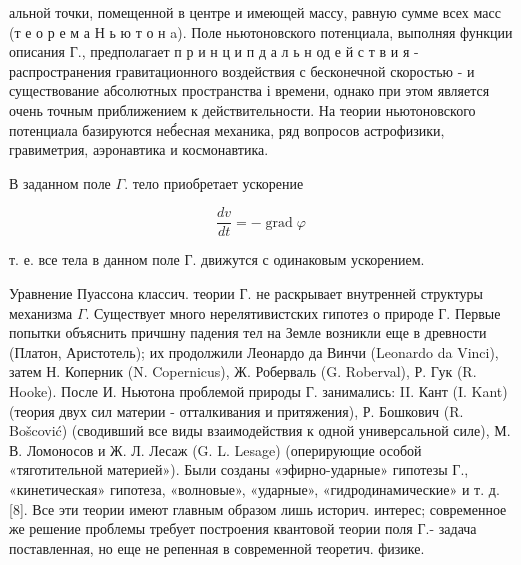 \documentclass[10pt]{article}
\begin{document}
альной точки, помещенной в центре и имеющей массу, равную сумме всех масс (т е о р е м а Н ь ю т о н a). Поле ньютоновского потенциала, выполняя функции описания Г., предполагает п р и н ц и п д а л ь н од е й с т в и я - распространения гравитационного воздействия с бесконечной скоростью - и существование абсолютных пространства і времени, однако при этом является очень точным приближением к действительности. На теории ньютоновского потенциала базируются неб́есная механика, ряд вопросов астрофизики, гравиметрия, аэронавтика и космонавтика.



В заданном поле $\Gamma$. тело приобретает ускорение



\[

\frac{d v}{d t}=-\operatorname{grad} \varphi

\]



т. е. все тела в данном поле Г. движутся с одинаковым ускорением.



Уравнение Пуассона классич. теории Г. не раскрывает внутренней структуры механизма $\Gamma$. Существует много нерелятивистских гипотез о природе Г. Первые попытки объяснить причшну падения тел на Земле возникли еще в древности (Платон, Аристотель); их продолжили Леонардо да Винчи (Leonardo da Vinci), затем Н. Коперник (N. Copernicus), Ж. Роберваль (G. Roberval), Р. Гук (R. Hooke). После И. Ньютона проблемой природы Г. занимались: II. Кант (I. Kant) (теория двух сил материи - отталкивания и притяжения), Р. Бошкович (R. Bošcović) (сводивший все виды взаимодействия к одной универсальной силе), М. В. Ломоносов и Ж. Л. Лесаж (G. L. Lesage) (оперирующие особой «тяготительной материей»). Были созданы «эфирно-ударные» гипотезы Г., «кинетическая» гипотеза, «волновые», «ударные», «гидродинамические» и т. д. [8]. Все эти теории имеют главным образом лишь историч. интерес; современное же решение проблемы требует построения квантовой теории поля Г.- задача поставленная, но еще не репенная в современной теоретич. физике.
\end{document}
